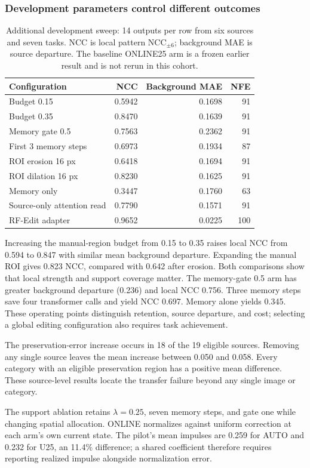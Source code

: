 \subsubsection{Development parameters control different outcomes}
\begin{table}[t]
\centering\small
\caption{Additional development sweep: 14 outputs per row from six sources and seven tasks. NCC is local pattern NCC$_{\pm6}$; background MAE is source departure. The baseline ONLINE25 arm is a frozen earlier result and is not rerun in this cohort.}
\label{tab:parameter-sweep}
\setlength{\tabcolsep}{5pt}
\begin{tabular}{lrrr}
\toprule
Configuration & NCC & Background MAE & NFE\\
\midrule
Budget 0.15 & 0.5942 & 0.1698 & 91\\
Budget 0.35 & 0.8470 & 0.1639 & 91\\
Memory gate 0.5 & 0.7563 & 0.2362 & 91\\
First 3 memory steps & 0.6973 & 0.1934 & 87\\
ROI erosion 16 px & 0.6418 & 0.1694 & 91\\
ROI dilation 16 px & 0.8230 & 0.1625 & 91\\
Memory only & 0.3447 & 0.1760 & 63\\
Source-only attention read & 0.7790 & 0.1571 & 91\\
RF-Edit adapter & 0.9652 & 0.0225 & 100\\
\bottomrule
\end{tabular}
\end{table}

Increasing the manual-region budget from 0.15 to 0.35 raises local NCC from 0.594 to 0.847 with similar mean background departure. Expanding the manual ROI gives 0.823 NCC, compared with 0.642 after erosion. Both comparisons show that local strength and support coverage matter. The memory-gate 0.5 arm has greater background departure (0.236) and local NCC 0.756. Three memory steps save four transformer calls and yield NCC 0.697. Memory alone yields 0.345. These operating points distinguish retention, source departure, and cost; selecting a global editing configuration also requires task achievement.

The preservation-error increase occurs in 18 of the 19 eligible sources. Removing any single source leaves the mean increase between 0.050 and 0.058. Every category with an eligible preservation region has a positive mean difference. These source-level results locate the transfer failure beyond any single image or category.

The support ablation retains $\lambda=0.25$, seven memory steps, and gate one while changing spatial allocation. ONLINE normalizes against uniform correction at each arm's own current state. The pilot's mean impulses are 0.259 for AUTO and 0.232 for U25, an 11.4\% difference; a shared coefficient therefore requires reporting realized impulse alongside normalization error.
